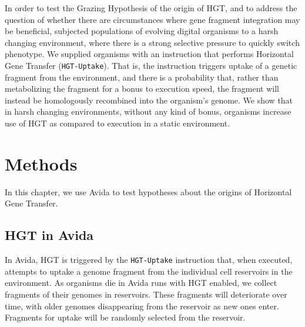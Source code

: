 \documentclass[PhD]{msu-thesis}
\begin{document}
In order to test the Grazing Hypothesis of the origin of HGT, and to address the question of whether there are circumstances where gene fragment integration may be beneficial, subjected populations of evolving digital organisms to a harsh changing environment,
where there is a strong selective pressure to quickly switch phenotype. We supplied organisms with an instruction that performs Horizontal Gene Transfer (\texttt{HGT-Uptake}). That is, the instruction triggers uptake of a genetic fragment from the environment, and there is a probability that, rather than metabolizing the fragment for a bonus to execution speed, the fragment will instead be homologously recombined into the organism's genome. We show that in harsh changing environments, without any kind of bonus, organisms increase use of HGT as compared to execution in a static environment.


\section{Methods}
In this chapter, we use Avida to test hypotheses about the origins of Horizontal Gene Transfer. 

\subsection{HGT in Avida}
In Avida, HGT is triggered by the \texttt{HGT-Uptake} instruction that, when executed, attempts to uptake a genome fragment from the individual cell reservoirs in the environment. As organisms die in Avida runs with HGT enabled, we collect fragments of their genomes in reservoirs. These fragments will deteriorate over time, with older genomes disappearing from the reservoir as new ones enter. Fragments for uptake will be randomly selected from the reservoir.  
\end{document}
